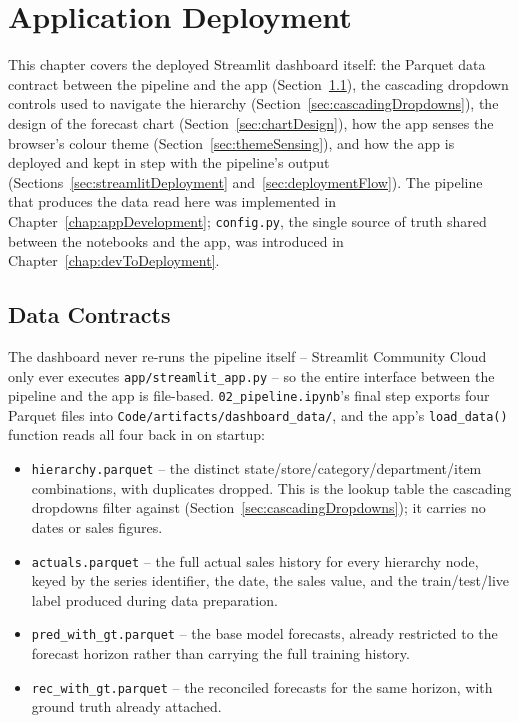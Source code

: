 %
%
%

\chapter{Application Deployment}
\label{chap:appDeployment}

This chapter covers the deployed Streamlit dashboard itself: the Parquet data contract between the pipeline and the app (Section~\ref{sec:dataContracts}), the cascading dropdown controls used to navigate the hierarchy (Section~\ref{sec:cascadingDropdowns}), the design of the forecast chart (Section~\ref{sec:chartDesign}), how the app senses the browser's colour theme (Section~\ref{sec:themeSensing}), and how the app is deployed and kept in step with the pipeline's output (Sections~\ref{sec:streamlitDeployment} and~\ref{sec:deploymentFlow}). The pipeline that produces the data read here was implemented in Chapter~\ref{chap:appDevelopment}; \texttt{config.py}, the single source of truth shared between the notebooks and the app, was introduced in Chapter~\ref{chap:devToDeployment}.

\section{Data Contracts}
\label{sec:dataContracts}

The dashboard never re-runs the pipeline itself -- Streamlit Community Cloud only ever executes \texttt{app/streamlit\_app.py} -- so the entire interface between the pipeline and the app is file-based. \texttt{02\_pipeline.ipynb}'s final step exports four Parquet files into \texttt{Code/artifacts/dashboard\_data/}, and the app's \texttt{load\_data()} function reads all four back in on startup:

\begin{itemize}
	\item \texttt{hierarchy.parquet} -- the distinct state/store/category/department/item combinations, with duplicates dropped. This is the lookup table the cascading dropdowns filter against (Section~\ref{sec:cascadingDropdowns}); it carries no dates or sales figures.
	\item \texttt{actuals.parquet} -- the full actual sales history for every hierarchy node, keyed by the series identifier, the date, the sales value, and the train/test/live label produced during data preparation.
	\item \texttt{pred\_with\_gt.parquet} -- the base model forecasts, already restricted to the forecast horizon rather than carrying the full training history.
	\item \texttt{rec\_with\_gt.parquet} -- the reconciled forecasts for the same horizon, with ground truth already attached.
\end{itemize}

